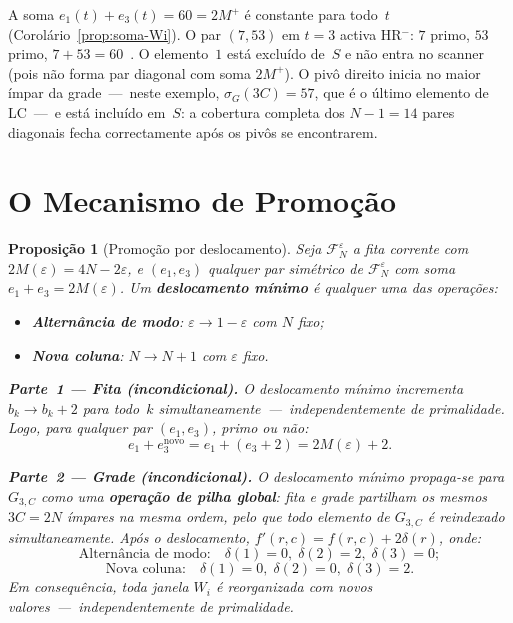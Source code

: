 \documentclass[12pt, a4paper]{article}
\theoremstyle{plain}
\newtheorem{proposition}[theorem]{Proposição}
\theoremstyle{definition}
\theoremstyle{remark}
\begin{document}
	A soma $e_1(t)+e_3(t)=60=2M^+$ é constante para todo~$t$
	(Corolário~\ref{prop:soma-Wi}).
	O par $(7,53)$ em $t=3$ activa HR$^-$: $7$ primo, $53$ primo,
	$7+53=60$~\checkmark.  O elemento~$1$ está excluído de~$S$ e não
	entra no scanner (pois não forma par diagonal com soma $2M^+$).
	O pivô direito inicia no maior ímpar da grade~---~neste exemplo,
	$\sigma_G(3C)=57$, que é o último elemento de LC~---~e está
	incluído em~$S$: a cobertura completa dos $N-1=14$ pares diagonais
	fecha correctamente após os pivôs se encontrarem.
	
	\section{O Mecanismo de Promoção}
	\label{sec:promocao}
	
	\begin{proposition}[Promoção por deslocamento]
		\label{prop:promocao}
		Seja $\mathcal{F}_N^\varepsilon$ a fita corrente com
		$2M(\varepsilon)=4N-2\varepsilon$, e $(e_1,e_3)$ qualquer par
		simétrico de $\mathcal{F}_N^\varepsilon$ com soma
		$e_1+e_3=2M(\varepsilon)$.  Um \textbf{deslocamento mínimo} é
		qualquer uma das operações:
		\begin{itemize}
			\item \textbf{Alternância de modo}:
			$\varepsilon\to1-\varepsilon$ com $N$ fixo;
			\item \textbf{Nova coluna}: $N\to N+1$ com $\varepsilon$ fixo.
		\end{itemize}
		
		\medskip
		\textbf{Parte~1 --- Fita (incondicional).}
		O deslocamento mínimo incrementa $b_k\to b_k+2$ para todo~$k$
		simultaneamente~---~independentemente de primalidade.  Logo, para
		qualquer par $(e_1,e_3)$, primo ou não:
		\[
		e_1 + e_3^{\text{novo}}
		= e_1 + (e_3+2)
		= 2M(\varepsilon)+2.
		\]
		
		\medskip
		\textbf{Parte~2 --- Grade (incondicional).}
		O deslocamento mínimo propaga-se para $G_{3,C}$ como uma
		\textbf{operação de pilha global}: fita e grade partilham os
		mesmos $3C=2N$ ímpares na mesma ordem, pelo que todo elemento de
		$G_{3,C}$ é reindexado simultaneamente.  Após o deslocamento,
		$f'(r,c) = f(r,c) + 2\delta(r)$, onde:
		\[
		\text{Alternância de modo:}\quad
		\delta(1)=0,\;\delta(2)=2,\;\delta(3)=0;
		\]
		\[
		\text{Nova coluna:}\quad
		\delta(1)=0,\;\delta(2)=0,\;\delta(3)=2.
		\]
		Em consequência, toda janela $W_i$ é reorganizada com novos
		valores~---~independentemente de primalidade.
	\end{proposition}
	
\end{document}
